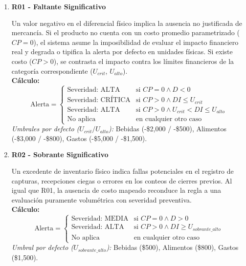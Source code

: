 \documentclass[11pt]{article}
\begin{document}
\begin{enumerate}

    \item \textbf{R01 - Faltante Significativo}
    
        Un valor negativo en el diferencial físico implica la ausencia no justificada de mercancía. Si el producto no cuenta con un costo promedio parametrizado ($CP = 0$), el sistema asume la imposibilidad de evaluar el impacto financiero real y degrada o tipifica la alerta por defecto en unidades físicas. Si existe costo ($CP > 0$), se contrasta el impacto contra los límites financieros de la categoría correspondiente ($U_{crit}$, $U_{alto}$).
        \\
        \textbf{Cálculo:}
        \[
        \text{Alerta} = \begin{cases} 
        \text{Severidad: ALTA} & \text{si } CP = 0 \land D < 0 \\
        \text{Severidad: CRÍTICA} & \text{si } CP > 0 \land DI \le U_{crit} \\
        \text{Severidad: ALTA} & \text{si } CP > 0 \land U_{crit} < DI \le U_{alto} \\
        \text{No aplica} & \text{en cualquier otro caso}
        \end{cases}
        \]
        \textit{Umbrales por defecto ($U_{crit} / U_{alto}$):} Bebidas (-\$2,000 / -\$500), Alimentos (-\$3,000 / -\$800), Gastos (-\$5,000 / -\$1,500).

    \item \textbf{R02 - Sobrante Significativo}
    
         Un excedente de inventario físico indica fallas potenciales en el registro de capturas, recepciones ciegas o errores en los conteos de cierres previos. Al igual que R01, la ausencia de costo mapeado reconduce la regla a una evaluación puramente volumétrica con severidad preventiva.
         \\
        \textbf{Cálculo:}
        \[
        \text{Alerta} = \begin{cases} 
        \text{Severidad: MEDIA} & \text{si } CP = 0 \land D > 0 \\
        \text{Severidad: ALTA} & \text{si } CP > 0 \land DI \ge U_{sobrante\_alto} \\
        \text{No aplica} & \text{en cualquier otro caso}
        \end{cases}
        \]
        \textit{Umbral por defecto ($U_{sobrante\_alto}$):} Bebidas (\$500), Alimentos (\$800), Gastos (\$1,500).
    


\end{enumerate}
\end{document}
